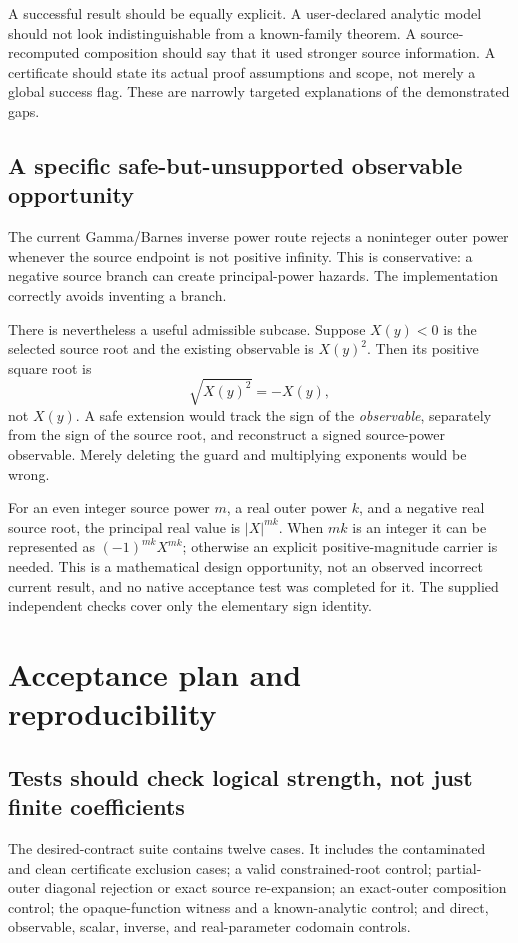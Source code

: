 \documentclass[11pt,letterpaper]{article}
\begin{document}
A successful result should be equally explicit. A user-declared analytic model should not look indistinguishable from a known-family theorem. A source-recomputed composition should say that it used stronger source information. A certificate should state its actual proof assumptions and scope, not merely a global success flag. These are narrowly targeted explanations of the demonstrated gaps.

\subsection{A specific safe-but-unsupported observable opportunity}
The current Gamma/Barnes inverse power route rejects a noninteger outer power whenever the source endpoint is not positive infinity. This is conservative: a negative source branch can create principal-power hazards. The implementation correctly avoids inventing a branch.\cite{gammaops}

There is nevertheless a useful admissible subcase. Suppose $X(y)<0$ is the selected source root and the existing observable is $X(y)^2$. Then its positive square root is
\begin{equation}
 \sqrt{X(y)^2}=-X(y),
\end{equation}
not $X(y)$. A safe extension would track the sign of the \emph{observable}, separately from the sign of the source root, and reconstruct a signed source-power observable. Merely deleting the guard and multiplying exponents would be wrong.

For an even integer source power $m$, a real outer power $k$, and a negative real source root, the principal real value is $|X|^{mk}$. When $mk$ is an integer it can be represented as $(-1)^{mk}X^{mk}$; otherwise an explicit positive-magnitude carrier is needed. This is a mathematical design opportunity, not an observed incorrect current result, and no native acceptance test was completed for it. The supplied independent checks cover only the elementary sign identity.

\section{Acceptance plan and reproducibility}
\subsection{Tests should check logical strength, not just finite coefficients}
The desired-contract suite contains twelve cases. It includes the contaminated and clean certificate exclusion cases; a valid constrained-root control; partial-outer diagonal rejection or exact source re-expansion; an exact-outer composition control; the opaque-function witness and a known-analytic control; and direct, observable, scalar, inverse, and real-parameter codomain controls.
\end{document}
